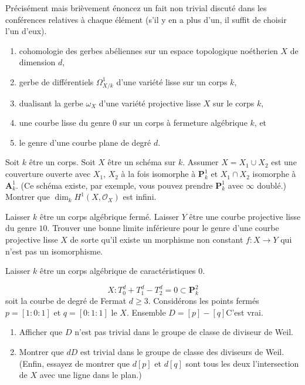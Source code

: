 \begin{exercise}[Theorems]
\label{exercise-results-spring-2020}
Précisément mais brièvement énoncez un fait non trivial discuté dans les conférences relatives à
chaque élément (s'il y en a plus d'un, il suffit de choisir
l'un d'eux).
\begin{enumerate}
\item cohomologie des gerbes abéliennes sur un espace topologique noétherien $X$
de dimension $d$,
\item gerbe de différentiels $\Omega^1_{X/k}$ d'une variété lisse sur un
corps $k$,
\item dualisant la gerbe $\omega_X$ d'une variété projective lisse $X$ sur
le corps $k$,
\item une courbe lisse
du genre $0$ sur un corps à fermeture algébrique $k$, et
\item le genre d'une courbe plane de degré $d$.
\end{enumerate}
\end{exercise}

\begin{exercise}
\label{exercise-coh-P1-infty-doubled}
Soit $k$ être un corps. Soit $X$ être un schéma sur $k$. Assumer
$X = X_1 \cup X_2$ est une couverture ouverte avec $X_1$, $X_2$
à la fois isomorphe à $\mathbf{P}^1_k$ et $X_1 \cap X_2$ isomorphe à
$\mathbf{A}^1_k$. (Ce schéma existe, par exemple, vous pouvez prendre $\mathbf{P}^1_k$ avec
$\infty$ doublé.) Montrer que $\dim_k H^1(X, \mathcal{O}_X)$ est infini.
\end{exercise}

\begin{exercise}
\label{exercise-no-morphism}
Laisser $k$ être un corps algébrique fermé. Laisser $Y$ être une courbe projective lisse
du genre $10$. Trouver une bonne limite inférieure pour le
genre d'une courbe projective lisse
$X$ de sorte qu'il existe un morphisme non constant $f : X \to Y$
qui n'est pas un isomorphisme.
\end{exercise}

\begin{exercise}
\label{exercise-element-order-n-in-pic}
Laisser $k$ être un corps algébrique de caractéristiques $0$.

$$
X : T_0^d + T_1^d - T_2^d = 0 \subset \mathbf{P}^2_k
$$
soit la courbe de degré de Fermat $d \geq 3$. Considérons les points fermés $p = [1 : 0
: 1]$ et $q = [0 : 1 : 1]$ le $X$. Ensemble $D = [p] - [q]$C'est vrai.
\begin{enumerate}
\item Afficher que $D$ n'est pas trivial dans le groupe de classe de diviseur de Weil.
\item Montrer que $d D$ est trivial dans le groupe de classe des diviseurs de
Weil. (Enfin, essayez de montrer que $d[p]$ et $d[q]$ sont tous les deux l'intersection de
$X$ avec une ligne dans le plan.)
\end{enumerate}
\end{exercise}

